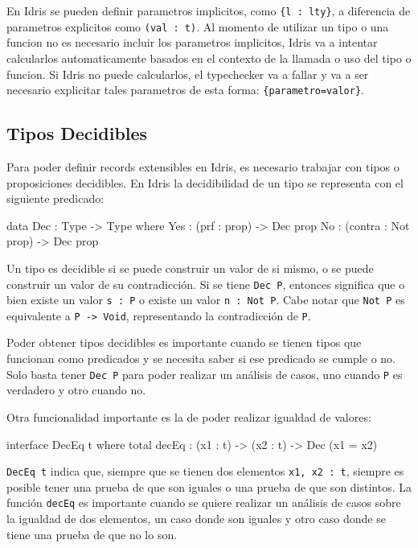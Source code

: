 En Idris se pueden definir parametros implicitos, como \texttt{\{l : lty\}}, a diferencia de parametros explicitos como \texttt{(val : t)}. Al momento de utilizar un tipo o una funcion no es necesario incluir los parametros implicitos, Idris va a intentar calcularlos automaticamente basados en el contexto de la llamada o uso del tipo o funcion. Si Idris no puede calcularlos, el typechecker va a fallar y va a ser necesario explicitar tales parametros de esta forma: \texttt{\{parametro=valor\}}.

\subsection{Tipos Decidibles}

Para poder definir records extensibles en Idris, es necesario trabajar con tipos o proposiciones decidibles. En Idris la decidibilidad de un tipo se representa con el siguiente predicado:

\begin{code}
data Dec : Type -> Type where
  Yes : (prf : prop) -> Dec prop
  No  : (contra : Not prop) -> Dec prop
\end{code}

Un tipo es decidible si se puede construir un valor de si mismo, o se puede construir un valor de su contradicción. Si se tiene \texttt{Dec P}, entonces significa que o bien existe un valor \texttt{s : P} o existe un valor \texttt{n : Not P}. Cabe notar que \texttt{Not P} es equivalente a \texttt{P -> Void}, representando la contradicción de \texttt{P}.

Poder obtener tipos decidibles es importante cuando se tienen tipos que funcionan como predicados y se necesita saber si ese predicado se cumple o no. Solo basta tener \texttt{Dec P} para poder realizar un análisis de casos, uno cuando \texttt{P} es verdadero y otro cuando no.

Otra funcionalidad importante es la de poder realizar igualdad de valores:

\begin{code}
interface DecEq t where
  total decEq : (x1 : t) -> (x2 : t) -> Dec (x1 = x2)
\end{code}

\texttt{DecEq t} indica que, siempre que se tienen dos elementos \texttt{x1, x2 : t}, siempre es posible tener una prueba de que son iguales o una prueba de que son distintos. La función \texttt{decEq} es importante cuando se quiere realizar un análisis de casos sobre la igualdad de dos elementos, un caso donde son iguales y otro caso donde se tiene una prueba de que no lo son.

